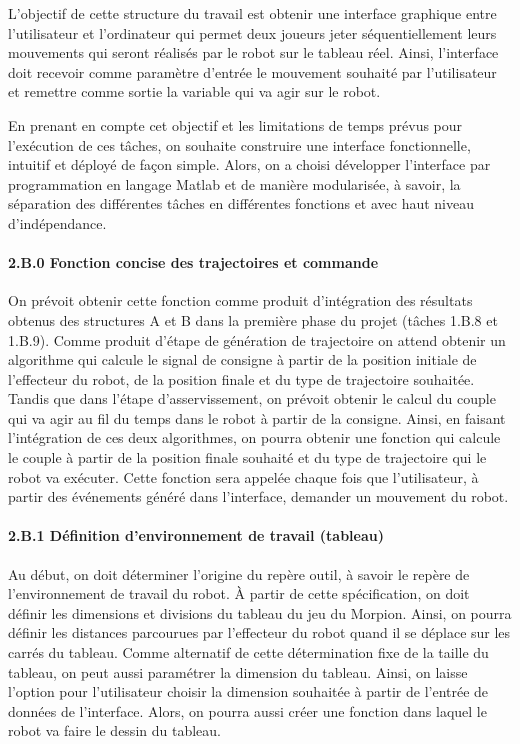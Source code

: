 
L’objectif de cette structure du travail est obtenir une interface graphique entre l’utilisateur et l’ordinateur qui permet deux joueurs jeter séquentiellement  leurs mouvements qui seront réalisés par le robot sur le tableau réel. Ainsi, l’interface doit recevoir comme paramètre d’entrée le mouvement souhaité par l’utilisateur et remettre comme sortie la variable qui va agir sur le robot. 

En prenant en compte cet objectif et les limitations de temps prévus pour l’exécution de ces tâches, on souhaite construire une interface fonctionnelle, intuitif et déployé de façon simple. Alors, on a choisi développer l’interface par programmation en langage Matlab et de manière modularisée, à savoir, la séparation des différentes tâches en différentes fonctions et avec haut niveau d'indépendance. 

\paragraph{2.B.0 Fonction concise des trajectoires et commande}
On prévoit obtenir cette fonction comme produit d'intégration des résultats obtenus des structures A et B dans la première phase du projet (tâches 1.B.8 et 1.B.9).
Comme produit d’étape de génération de trajectoire on attend obtenir un algorithme qui calcule le signal de consigne à partir de la position initiale de l'effecteur du robot,  de la position finale et du type de trajectoire souhaitée. Tandis que dans l’étape d’asservissement, on prévoit obtenir le calcul du couple qui va agir au fil du temps dans le robot à partir de la consigne. 
Ainsi, en faisant l’intégration de ces deux algorithmes, on pourra obtenir une fonction qui calcule le couple à partir de la position finale souhaité et du type de trajectoire qui le robot va exécuter. Cette fonction sera appelée chaque fois que l’utilisateur, à partir des événements généré dans l’interface, demander un mouvement du robot. 

\paragraph{2.B.1 Définition d'environnement de travail (tableau)} 
Au début, on doit déterminer l’origine du repère outil, à savoir le repère de l’environnement de travail du robot. 
À partir de cette spécification, on doit définir les dimensions et divisions du tableau du jeu du Morpion. Ainsi, on pourra définir les distances parcourues par l'effecteur du robot quand il se déplace sur les carrés du tableau. 
Comme alternatif de cette détermination fixe de la taille du tableau, on peut aussi paramétrer la dimension du tableau. Ainsi, on laisse l’option pour l’utilisateur choisir la dimension souhaitée à partir de l’entrée de données de l’interface. Alors, on pourra aussi créer une fonction dans laquel le robot va faire le dessin du tableau.  

